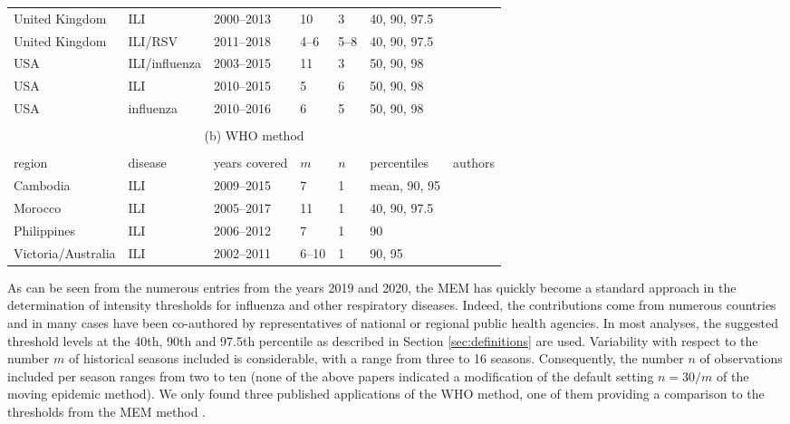 \documentclass{article}
\begin{document}
\begin{table}[h!]
\begin{tabular}{l l l l l l l}
United Kingdom & ILI & 2000--2013 & 10 & 3 & 40, 90, 97.5 & \cite{Green2015}\\
United Kingdom & ILI/RSV & 2011--2018 & 4--6 & 5--8 & 40, 90, 97.5 & \cite{Harcourt2019}\\
USA & ILI/influenza & 2003--2015 & 11 & 3 & 50, 90, 98 & \cite{Biggerstaff2017}\\
USA & ILI & 2010--2015 & 5 & 6 & 50, 90, 98 & \cite{Dahlgren2018}\\
USA & influenza & 2010--2016 & 6 & 5 & 50, 90, 98 & \cite{Dahlgren2019}\\
\bottomrule\\
\multicolumn{7}{c}{(b) WHO method}\\ \\
\toprule
region & disease & years covered & $m$ & $n$ & percentiles & authors\\
\midrule
Cambodia & ILI & 2009--2015 & 7 & 1 & mean, 90, 95 & \cite{Ly2017}\\
Morocco & ILI & 2005--2017 & 11 & 1 & 40, 90, 97.5 & \cite{Rguig2020}\\
Philippines & ILI & 2006--2012 & 7 & 1 & 90 & \cite{Lucero2016}\\
Victoria/Australia & ILI & 2002--2011 & 6--10 & 1 & 90, 95 & \cite{Tay2013}\\
\end{tabular}
\end{table}

As can be seen from the numerous entries from the years 2019 and 2020, the MEM has quickly become a standard approach in the determination of intensity thresholds for influenza and other respiratory diseases. Indeed, the contributions come from numerous countries and in many cases have been co-authored by representatives of national or regional public health agencies. In most analyses, the suggested threshold levels at the 40th, 90th and 97.5th percentile as described in Section \ref{sec:definitions} are used. Variability with respect to the number $m$ of historical seasons included is considerable, with a range from three to 16 seasons. Consequently, the number $n$ of observations included per season ranges from two to ten (none of the above papers indicated a modification of the default setting $n = 30/m$ of the moving epidemic method). We only found three published applications of the WHO method, one of them providing a comparison to the thresholds from the MEM method \citep{Rguig2020}.




\end{document}
